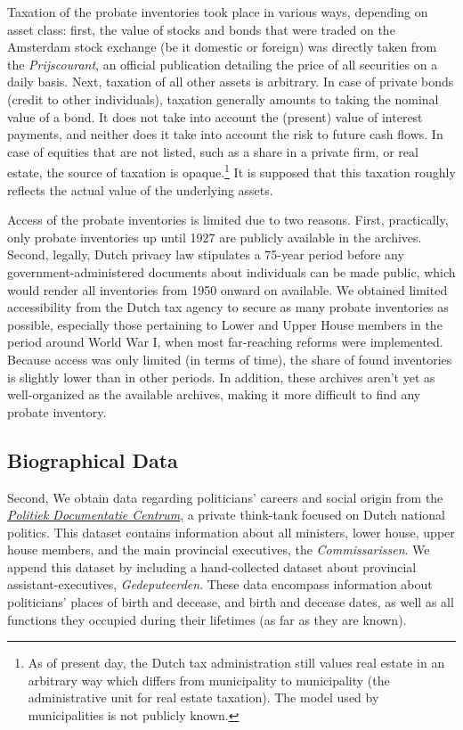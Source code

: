 Taxation of the probate inventories took place in various ways, depending on asset class: first, the value of stocks and bonds that were traded on the Amsterdam stock exchange (be it domestic or foreign) was directly taken from the \textit{Prijscourant}, an official publication detailing the price of all securities on a daily basis. Next, taxation of all other assets is arbitrary. In case of private bonds (credit to other individuals), taxation generally amounts to taking the nominal value of a bond. It does not take into account the (present) value of interest payments, and neither does it take into account the risk to future cash flows. In case of equities that are not listed, such as a share in a private firm, or real estate, the source of taxation is opaque.\footnote{As of present day, the Dutch tax administration still values real estate in an arbitrary way which differs from municipality to municipality (the administrative unit for real estate taxation). The model used by municipalities is not publicly known.} It is supposed that this taxation roughly reflects the actual value of the underlying assets. 

Access of the probate inventories is limited due to two reasons. First, practically, only probate inventories up until 1927 are publicly available in the archives. Second, legally, Dutch privacy law stipulates a 75-year period before any government-administered documents about individuals can be made public, which would render all inventories from 1950 onward on available. We obtained limited accessibility from the Dutch tax agency to secure as many probate inventories as possible, especially those pertaining to Lower and Upper House members in the period around World War I, when most far-reaching reforms were implemented. Because access was only limited (in terms of time), the share of found inventories is slightly lower than in other periods. In addition, these archives aren't yet as well-organized as the available archives, making it more difficult to find any probate inventory. 

\subsection{Biographical Data}
Second, We obtain data regarding politicians' careers and social origin from the \href{www.pdc.nl}{\textit{Politiek Documentatie Centrum}}, a private think-tank focused on Dutch national politics. This dataset contains information about all ministers, lower house, upper house members, and the main provincial executives, the \textit{Commissarissen}. We append this dataset by including a hand-collected dataset about provincial assistant-executives, \textit{Gedeputeerden}. These data encompass information about politicians' places of birth and decease, and birth and decease dates, as well as all functions they occupied during their lifetimes (as far as they are known). 

